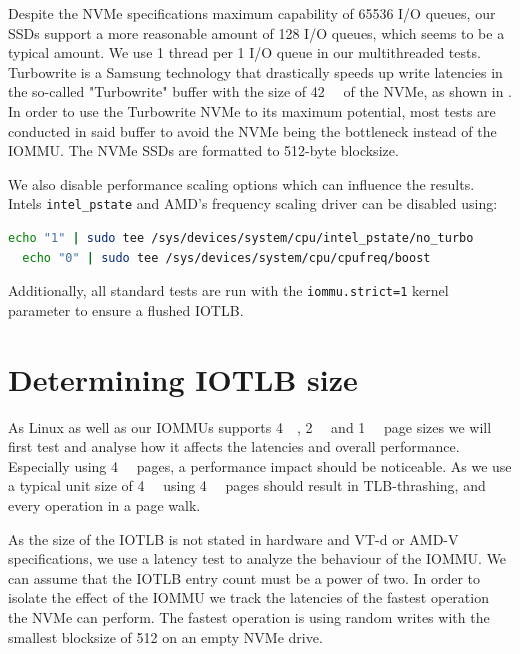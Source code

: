 Despite the NVMe specifications maximum capability of 65536 I/O queues, our SSDs support a more reasonable amount of 128 I/O queues, which seems to be a typical amount.
We use 1 thread per 1 I/O queue in our multithreaded tests. Turbowrite is a Samsung technology that drastically speeds up write latencies in the so-called "Turbowrite" buffer with the size of \qty{42}{\giga\byte} of the NVMe, as shown in \cite{vroom}. In order to use the Turbowrite NVMe to its maximum potential, most tests are conducted in said buffer to avoid the NVMe being the bottleneck instead of the IOMMU.
The NVMe SSDs are formatted to 512-byte blocksize.

We also disable performance scaling options which can influence the results.
Intels \texttt{intel\_pstate} and AMD's frequency scaling driver can be disabled using:

\begin{lstlisting}[language=bash, label=lst:vfiobind, frame=single]
  echo "1" | sudo tee /sys/devices/system/cpu/intel_pstate/no_turbo
  echo "0" | sudo tee /sys/devices/system/cpu/cpufreq/boost
\end{lstlisting}

Additionally, all standard tests are run with the \texttt{iommu.strict=1} kernel parameter to ensure a flushed IOTLB.


\section{Determining IOTLB size}
As Linux as well as our IOMMUs supports \qty{4}{\kibi\byte}, \qty{2}{\mebi\byte} and \qty{1}{\gibi\byte} page sizes we will first test and analyse how it affects the latencies and overall performance. Especially using \qty{4}{\kibi\byte} pages, a performance impact should be noticeable. As we use a typical unit size of \qty{4}{\kibi\byte} using \qty{4}{\kibi\byte} pages should result in TLB-thrashing, and every operation in a page walk.

As the size of the IOTLB is not stated in hardware and VT-d or AMD-V specifications, we use a latency test to analyze the behaviour of the IOMMU. We can assume that the IOTLB entry count must be a power of two. In order to isolate the effect of the IOMMU we track the latencies of the fastest operation the NVMe can perform. The fastest operation is using random writes with the smallest blocksize of \qty{512}{\byte} on an empty NVMe drive.

